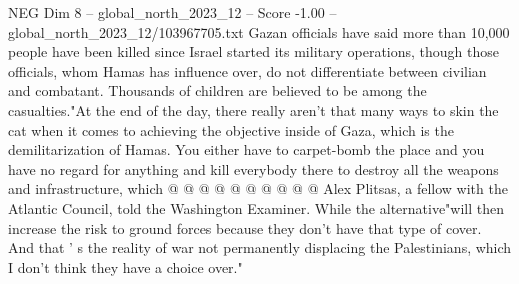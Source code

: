 \begin{textsample}{NEG Dim 8 – global\_north\_2023\_12 – Score -1.00 – global\_north\_2023\_12/103967705.txt}
Gazan officials have said more than 10,000 people have been killed since Israel started its military operations, though those officials, whom Hamas has influence over, do not differentiate between civilian and combatant.
Thousands of children are believed to be among the casualties."At the end of the day, there really aren't that many ways to skin the cat when it comes to achieving the objective inside of Gaza, which is the demilitarization of Hamas.
You either have to carpet-bomb the place and you have no regard for anything and kill everybody there to destroy all the weapons and infrastructure, which @ @ @ @ @ @ @ @ @ @ Alex Plitsas, a fellow with the Atlantic Council, told the Washington Examiner.
While the alternative"will then increase the risk to ground forces because they don't have that type of cover.
And that ' s the reality of war not permanently displacing the Palestinians, which I don't think they have a choice over."

\end{textsample}
